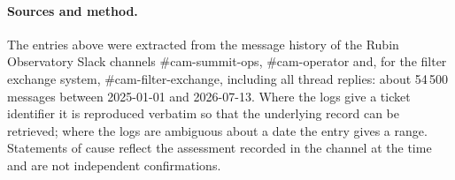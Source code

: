 \paragraph{Sources and method.}
The entries above were extracted from the message history of the Rubin
Observatory Slack channels \#cam-summit-ops, \#cam-operator and, for the
filter exchange system, \#cam-filter-exchange, including all thread
replies: about 54\,500 messages between 2025-01-01 and 2026-07-13.  Where the logs give a ticket identifier it is
reproduced verbatim so that the underlying record can be retrieved;
where the logs are ambiguous about a date the entry gives a range.
Statements of cause reflect the assessment recorded in the channel at
the time and are not independent confirmations.
